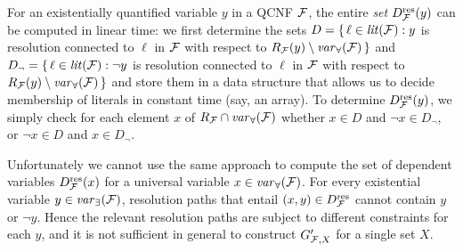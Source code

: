 \documentclass{llncs}
\newcommand{\Dres}{D^{\text{\normalfont res}}}
\newcommand{\SB}{\{\,} \newcommand{\SM}{\;{:}\;} \newcommand{\SE}{\,\}}
\begin{document}
For an existentially quantified variable $y$ in a QCNF $\mathcal{F}$, the entire
\emph{set} $\Dres_{\FFF}(y)$ can be computed in linear time: we first
determine the sets $D = \SB \ell \in \lit(\FFF) \SM y$ is resolution connected
to $\ell$ in $\mathcal{F}$ with respect to $R_{\FFF}(y) \setminus
\var_{\forall}(\FFF) \SE$ and $D_{\neg} = \SB \ell \in \lit(\FFF) \SM \neg y$
is resolution connected to $\ell$ in $\mathcal{F}$ with respect to $R_{\FFF}(y)
\setminus \var_{\forall}(\FFF) \SE$ and store them in a data structure that
allows us to decide membership of literals in constant time (say, an
array). To determine $\Dres_{\FFF}(y)$, we simply check for each element $x$
of $R_{\mathcal{F}} \cap \mathit{var}_{\forall}(\mathcal{F})$ whether $x \in D$ and $\neg x \in
D_{\neg}$, or $\neg x \in D$ and $x \in D_{\neg}$.

Unfortunately we cannot use the same approach to compute the set of dependent
variables $\Dres_{\FFF}(x)$ for a universal variable $x \in
\mathit{var}_{\forall}(\mathcal{F})$. For every existential variable $y \in
\mathit{var}_{\exists}(\mathcal{F})$, resolution paths that entail $(x,y) \in \Dres_{\FFF}$
cannot contain $y$ or $\neg y$. Hence the relevant resolution paths are
subject to different constraints for each $y$, and it is not sufficient in
general to construct $G'_{\mathcal{F},X}$ for a single set $X$.
\end{document}
